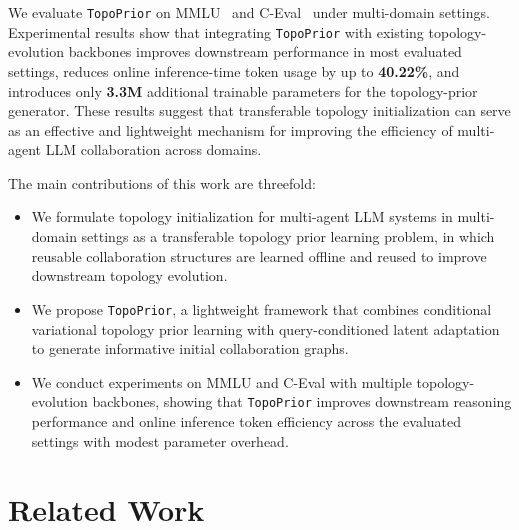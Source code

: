 \documentclass[lettersize,journal]{IEEEtran}
\theoremstyle{plain}
\begin{document}
We evaluate \texttt{TopoPrior} on MMLU~\cite{DBLP:conf/iclr/HendrycksBBZMSS21} and C-Eval~\cite{DBLP:conf/nips/HuangBZZZSLLZLF23} under multi-domain settings. Experimental results show that integrating \texttt{TopoPrior} with existing topology-evolution backbones improves downstream performance in most evaluated settings, reduces online inference-time token usage by up to \textbf{40.22\%}, and introduces only \textbf{3.3M} additional trainable parameters for the topology-prior generator. These results suggest that transferable topology initialization can serve as an effective and lightweight mechanism for improving the efficiency of multi-agent LLM collaboration across domains.

The main contributions of this work are threefold:
\begin{itemize}
    \item We formulate topology initialization for multi-agent LLM systems in multi-domain settings as a transferable topology prior learning problem, in which reusable collaboration structures are learned offline and reused to improve downstream topology evolution.
    \item We propose \texttt{TopoPrior}, a lightweight framework that combines conditional variational topology prior learning with query-conditioned latent adaptation to generate informative initial collaboration graphs.
    \item We conduct experiments on MMLU and C-Eval with multiple topology-evolution backbones, showing that \texttt{TopoPrior} improves downstream reasoning performance and online inference token efficiency across the evaluated settings with modest parameter overhead.
\end{itemize}




\section{Related Work}
\end{document}
